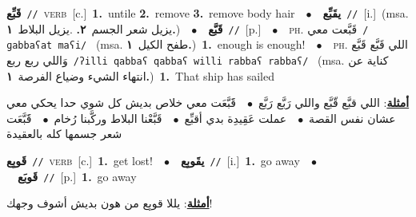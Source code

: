 \documentclass[10pt,a4paper,twoside]{article} %
\begin{document}
\begin{multicols}{2}
{{{{{{{{\setlength\topsep{0pt}\textbf{\foreignlanguage{arabic}{قَبِّع}}\ {\color{gray}\texttt{//}\color{black}}\ \textsc{verb}\ [c.]\ \textbf{1.}~untile  \textbf{2.}~remove  \textbf{3.}~remove body hair\ \ $\bullet$\ \ \setlength\topsep{0pt}\textbf{\foreignlanguage{arabic}{يقَبِّع}}\ {\color{gray}\texttt{//}\color{black}}\ [i.]\ \color{gray}(msa. \foreignlanguage{arabic}{يزيل شعر الجسم}~\foreignlanguage{arabic}{\textbf{٢.}}  .\foreignlanguage{arabic}{يزيل البلاط}~\foreignlanguage{arabic}{\textbf{١.}})\color{black}\ \ $\bullet$\ \ \setlength\topsep{0pt}\textbf{\foreignlanguage{arabic}{قَبَّع}}\ {\color{gray}\texttt{//}\color{black}}\ [p.]\ \ $\bullet$\ \ \textsc{ph.} \color{gray} \foreignlanguage{arabic}{قَبَّعت معي}\color{black}\ {\color{gray}\texttt{/{\sffamily ɡabbaʕat maʕi}/}\color{black}}\ \color{gray} (msa. \foreignlanguage{arabic}{طفح الكيل}~\foreignlanguage{arabic}{\textbf{١.}})\color{black}\ \textbf{1.}~enough is enough!\ \ $\bullet$\ \ \textsc{ph.} \color{gray} \foreignlanguage{arabic}{اللي قَبَّع قَبَّع وَاللي ربع ربع}\color{black}\ {\color{gray}\texttt{/{\sffamily ʔilli qabbaʕ qabbaʕ willi rabbaʕ rabbaʕ}/}\color{black}}\ \color{gray} (msa. \foreignlanguage{arabic}{كناية عن انتهاء الشيء وضياع الفرصة}~\foreignlanguage{arabic}{\textbf{١.}})\color{black}\ \textbf{1.}~That ship has sailed\  \begin{flushright}\color{gray}\foreignlanguage{arabic}{\textbf{\underline{\foreignlanguage{arabic}{أمثلة}}}: اللي قبَّع قّبَّع واللي رَبَّع رَبَّع\ $\bullet$\ \  قََبَّعَت معي خلاص بديش كل شوي حدا يحكي معي عشان نفس القصة\ $\bullet$\ \  عملت عَقِيدِة بدي أقبِّع\ $\bullet$\ \  قَبَّعْنا البلاط وركَّبنا رُخام\ $\bullet$\ \  قََبَّعَت شعر جسمها كله بالعقيدة}\end{flushright}\color{black}} \vspace{2mm}

{\setlength\topsep{0pt}\textbf{\foreignlanguage{arabic}{قَوبِع}}\ {\color{gray}\texttt{//}\color{black}}\ \textsc{verb}\ [c.]\ \textbf{1.}~get lost!\ \ $\bullet$\ \ \setlength\topsep{0pt}\textbf{\foreignlanguage{arabic}{يقَوبِع}}\ {\color{gray}\texttt{//}\color{black}}\ [i.]\ \textbf{1.}~go away\ \ $\bullet$\ \ \setlength\topsep{0pt}\textbf{\foreignlanguage{arabic}{قَوبَع}}\ {\color{gray}\texttt{//}\color{black}}\ [p.]\ \textbf{1.}~go away\  \begin{flushright}\color{gray}\foreignlanguage{arabic}{\textbf{\underline{\foreignlanguage{arabic}{أمثلة}}}: يللا قوبِع من هون بديش أشوف وجهك!}\end{flushright}\color{black}} \vspace{2mm}

}}}}}}}
\end{multicols}
\end{document}
